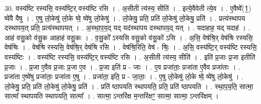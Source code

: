 \documentclass[17pt]{extarticle}
\begin{document}
30. वस्य॑ष्टि रस्यसि॒ वस्य॑ष्टि॒र् वस्य॑ष्टि रसि । . अ॒सीती त्य॑स्य॒ सीति॑ । . इत्ये॒वैवेती त्ये॒व । . ए॒वैष्वे᳚(1॒) ष्वे॑वै वैषु । . ए॒षु लो॒केषु॑ लो॒के ष्वे॒ ष्वे॑षु लो॒केषु॑ । . लो॒केषु॒ प्रति॒ प्रति॑ लो॒केषु॑ लो॒केषु॒ प्रति॑ । . प्रत्य॑स्थापय दस्थापय॒त् प्रति॒ प्रत्य॑स्थापयत् । . अ॒स्था॒प॒य॒द् यद् यद॑स्थापय दस्थापय॒द् यत् । . यदाहाह॒ यद् यदाह॑ । . आह॑ वसु॒को व॑सु॒क आहाह॑ वसु॒कः । . व॒सु॒को᳚ ऽस्यसि वसु॒को व॑सु॒को॑ ऽसि । . अ॒सि॒ वेष॑श्रि॒र् वेष॑श्रि रस्यसि॒ वेष॑श्रिः । . वेष॑श्रि रस्यसि॒ वेष॑श्रि॒र् वेष॑श्रि रसि । . वेष॑श्रि॒रिति॒ वेष॑ - श्रिः॒ । . अ॒सि॒ वस्य॑ष्टि॒र् वस्य॑ष्टि रस्यसि॒ वस्य॑ष्टिः । . वस्य॑ष्टि रस्यसि॒ वस्य॑ष्टि॒र् वस्य॑ष्टि रसि । . अ॒सीती त्य॑स्य॒ सीति॑ । . इति॑ प्र॒जाः प्र॒जा इतीति॑ प्र॒जाः । . प्र॒जा ए॒वैव प्र॒जाः प्र॒जा ए॒व । . प्र॒जा इति॑ प्र - जाः । . ए॒व प्रजा॑ताः॒ प्रजा॑ता ए॒वैव प्रजा॑ताः । . प्रजा॑ता ए॒ष्वे॑षु प्रजा॑ताः॒ प्रजा॑ता ए॒षु । . प्रजा॑ता॒ इति॒ प्र - जा॒ताः॒ । . ए॒षु लो॒केषु॑ लो॒के ष्वे॒ ष्वे॑षु लो॒केषु॑ । . लो॒केषु॒ प्रति॒ प्रति॑ लो॒केषु॑ लो॒केषु॒ प्रति॑ । . प्रति॑ ष्ठापयति स्थापयति॒ प्रति॒ प्रति॑ ष्ठापयति । . स्था॒प॒य॒ति॒ सात्मा॒ सात्मा᳚ स्थापयति स्थापयति॒ सात्मा᳚ । . सात्मा॒ ऽन्तरि॑क्ष म॒न्तरि॑क्षꣳ॒॒ सात्मा॒ सात्मा॒ ऽन्तरि॑क्षम् । \newline
\end{document}
